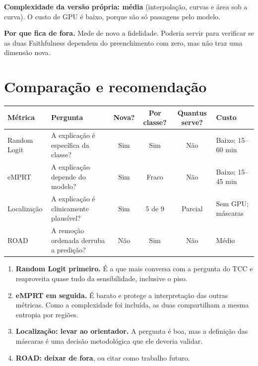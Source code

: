 \documentclass[11pt,a4paper]{article}
\begin{document}
\textbf{Complexidade da versão própria: média} (interpolação, curvas e área sob a curva). O custo de GPU é baixo, porque são só passagens pelo modelo.

\textbf{Por que fica de fora.} Mede de novo a fidelidade. Poderia servir para verificar se as duas Faithfulness dependem do preenchimento com zero, mas não traz uma dimensão nova.

\section{Comparação e recomendação}
\begin{center}\small
\begin{tabularx}{\linewidth}{lXcccl}
\toprule
\textbf{Métrica} & \textbf{Pergunta} & \textbf{Nova?} & \textbf{Por classe?} & \textbf{Quantus serve?} & \textbf{Custo} \\
\midrule
Random Logit & A explicação é específica da classe? & Sim & Sim & Não & Baixo; 15--60 min \\
eMPRT & A explicação depende do modelo? & Sim & Fraco & Não & Baixo; 15--45 min \\
Localização & A explicação é clinicamente plausível? & Sim & 5 de 9 & Parcial & Sem GPU; máscaras \\
ROAD & A remoção ordenada derruba a predição? & Não & Sim & Não & Médio \\
\bottomrule
\end{tabularx}
\end{center}

\begin{enumerate}
\item \textbf{Random Logit primeiro.} É a que mais conversa com a pergunta do TCC e reaproveita quase tudo da sensibilidade, inclusive o piso.
\item \textbf{eMPRT em seguida.} É barato e protege a interpretação das outras métricas. Como a complexidade foi incluída, as duas compartilham a mesma entropia por regiões.
\item \textbf{Localização: levar ao orientador.} A pergunta é boa, mas a definição das máscaras é uma decisão metodológica que ele deveria validar.
\item \textbf{ROAD: deixar de fora}, ou citar como trabalho futuro.
\end{enumerate}
\end{document}
